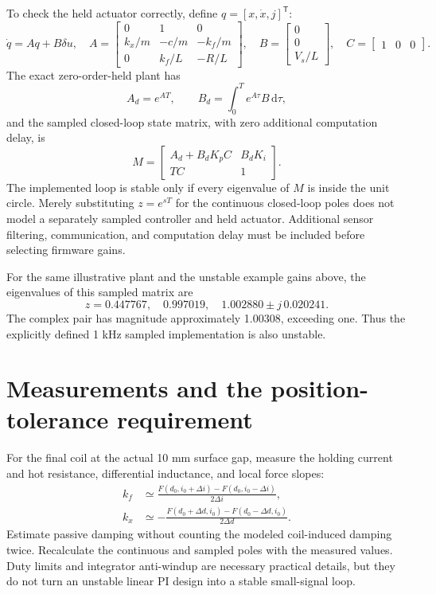 \documentclass[11pt,letterpaper]{article}
\newcommand{\dd}{\mathrm d}
\begin{document}
To check the held actuator correctly, define \(q=[x,\dot x,j]^\mathsf T\):
\begin{equation}
 \dot q=Aq+B\delta u,\quad
 A=\begin{bmatrix}
 0&1&0\\ k_x/m&-c/m&-k_f/m\\0&k_f/L&-R/L
 \end{bmatrix},\quad
 B=\begin{bmatrix}0\\0\\V_s/L\end{bmatrix},\quad
 C=\begin{bmatrix}1&0&0\end{bmatrix}.
\end{equation}
The exact zero-order-held plant has
\begin{equation}
 A_d=e^{AT},\qquad B_d=\int_0^T e^{A\tau}B\,\dd\tau,
\end{equation}
and the sampled closed-loop state matrix, with zero additional computation
delay, is
\begin{equation}
 M=\begin{bmatrix}A_d+B_dK_pC&B_dK_i\\TC&1\end{bmatrix}.
\end{equation}
The implemented loop is stable only if every eigenvalue of \(M\) is inside
the unit circle. Merely substituting \(z=e^{sT}\) for the continuous
closed-loop poles does not model a separately sampled controller and held
actuator. Additional sensor filtering, communication, and computation delay
must be included before selecting firmware gains.

For the same illustrative plant and the unstable example gains above,
the eigenvalues of this sampled matrix are
\begin{equation}
 z=0.447767,\quad 0.997019,\quad 1.002880\pm j\,0.020241.
\end{equation}
The complex pair has magnitude approximately 1.00308, exceeding one.
Thus the explicitly defined 1 kHz sampled implementation is also unstable.

\section{Measurements and the position-tolerance requirement}
For the final coil at the actual 10 mm surface gap, measure the holding
current and hot resistance, differential inductance, and local force slopes:
\begin{align}
 k_f&\simeq\frac{F(d_0,i_0+\Delta i)-F(d_0,i_0-\Delta i)}{2\Delta i},\\
 k_x&\simeq-\frac{F(d_0+\Delta d,i_0)-F(d_0-\Delta d,i_0)}{2\Delta d}.
\end{align}
Estimate passive damping without counting the modeled coil-induced damping
twice. Recalculate the continuous and sampled poles with the measured values.
Duty limits and integrator anti-windup are necessary practical details, but
they do not turn an unstable linear PI design into a stable small-signal loop.
\end{document}
